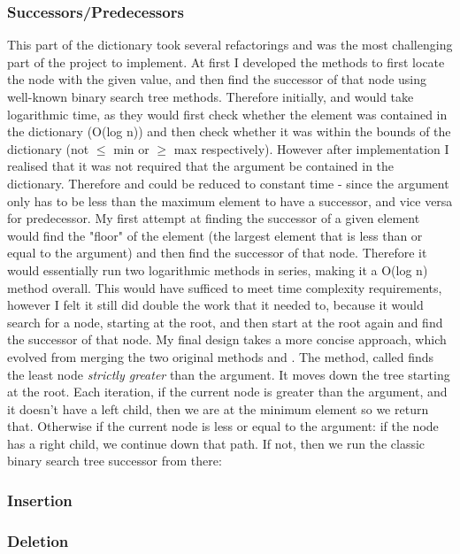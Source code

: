 \subsubsection{Successors/Predecessors}
This part of the dictionary took several refactorings and was the most challenging part of the project to implement. At first I developed the methods to first locate the node with the given value, and then find the successor of that node using well-known binary search tree methods. Therefore initially,  and  would take logarithmic time, as they would first check whether the element was contained in the dictionary (O(log n)) and then check whether it was within the bounds of the dictionary (not $\leq$ min or $\geq$ max respectively). However after implementation I realised that it was not required that the argument be contained in the dictionary. Therefore  and  could be reduced to constant time - since the argument only has to be less than the maximum element to have a successor, and vice versa for predecessor. My first attempt at finding the successor of a given element would find the "floor" of the element (the largest element that is less than or equal to the argument) and then find the successor of that node. Therefore it would essentially run two logarithmic methods in series, making it a O(log n) method overall. This would have sufficed to meet time complexity requirements, however I felt it still did double the work that it needed to, because it would search for a node, starting at the root, and then start at the root again and find the successor of that node. My final design takes a more concise approach, which evolved from merging the two original methods  and . The method, called  finds the least node \textit{strictly greater} than the argument. It moves down the tree starting at the root. Each iteration, if the current node is greater than the argument, and it doesn't have a left child, then we are at the minimum element so we return that. Otherwise if the current node is less or equal to the argument: if the node has a right child, we continue down that path. If not, then we run the classic binary search tree successor from there: 

\subsubsection{Insertion} 

\subsubsection{Deletion}